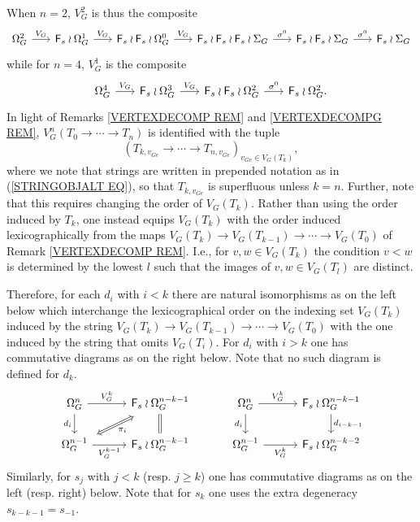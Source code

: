 \documentclass[a4paper,10pt]{article}%
\begin{document}
\begin{remark}\label{VGN REM}
When $n = 2$, $V_{G}^{2}$ is thus the composite
\[
\begin{tikzcd}[column sep =1.7em]
	\Omega_{G}^{2} \ar{r}{V_G} &
	\Fin_s \wr \Omega_{G}^{1} \ar{r}{V_G} &
	\Fin_s \wr \Fin_s \wr \Omega_{G}^{0} \ar{r}{V_G} &
	\Fin_s \wr \Fin_s \wr \Fin_s \wr \Sigma_{G} \ar{r}{\sigma^0} &
	\Fin_s \wr \Fin_s \wr \Sigma_{G} \ar{r}{\sigma^0} &
	\Fin_s \wr \Sigma_{G}
\end{tikzcd}
\]
while for $n=4$,  $V_{G}^{1}$ is the composite
\[
\begin{tikzcd}[column sep =1.7em]
	\Omega_{G}^{4} \ar{r}{V_G} &
	\Fin_s \wr \Omega_{G}^{3} \ar{r}{V_G} &
	\Fin_s \wr \Fin_s \wr \Omega_{G}^{2} \ar{r}{\sigma^0} &
	\Fin_s \wr \Omega_{G}^{2}.
\end{tikzcd}
\]
In light of Remarks \ref{VERTEXDECOMP REM} and \ref{VERTEXDECOMPG REM}, 
$V_{G}^{n}(T_0 \to \cdots \to T_n)$ is identified with the tuple 
\begin{equation}\label{VGNISO EQ}
	(T_{k,v_{G e}}\to \cdots \to T_{n,v_{G e}})_{v_{G e} \in V_G(T_k)},
\end{equation}
where we note that strings are written in prepended notation as in (\ref{STRINGOBJALT EQ}), so that $T_{k,v_{G e}}$ is superfluous unless $k=n$.
Further, note that this requires changing the order of $V_G(T_k)$.
Rather than using the order induced by $T_k$, one instead equips 
$V_G(T_k)$ with the order induced lexicographically
from the maps 
$V_G(T_k) \to V_G(T_{k-1}) \to \cdots \to V_G(T_0)$ 
of Remark \ref{VERTEXDECOMP REM}. I.e., for 
$v,w \in V_G(T_k)$ the condition $v<w$ is determined by the lowest $l$ such that the images of $v,w \in V_G(T_l)$ are distinct.

Therefore, for each $d_i$ with $i < k$ there are natural isomorphisms as on the left below which interchange the
lexicographical order on the indexing set $V_G(T_k)$
induced by the string
$V_G(T_k) \to V_G(T_{k-1}) \to \cdots \to V_G(T_0)$ 
with the one induced by the string that omits $V_G(T_i)$.
For $d_i$ with $i>k$ one has commutative diagrams as on the right below.
Note that no such diagram is defined for $d_k$.
\begin{equation}\label{PIIDEFDI EQ}
\begin{tikzcd}[row sep=1.7em,column sep = 3em]
	\Omega_{G}^{n} \ar{d}[swap]{d_{i}} \ar{r}{V_G^k} &
	|[alias=F1]|
	\Fin_s \wr \Omega_{G}^{n-k-1}
	\ar[equal]{d} 
&
	\Omega_{G}^{n} \ar{d}[swap]{d_{i}} \ar{r}{V_G^k} &
	\Fin_s \wr \Omega_{G}^{n-k-1}
	\ar{d}{d_{i-k-1}} 
\\
	|[alias=G2]|
	\Omega_{G}^{n-1} \ar{r}[swap]{V_G^{k-1}}&
	\Fin_s \wr \Omega_{G}^{n-k-1}  
&
	\Omega_{G}^{n-1} \ar{r}[swap]{V_G^{k}}&
	\Fin_s \wr \Omega_{G}^{n-k-2}  
\arrow[Leftrightarrow, from=F1, to=G2,shorten >=0.15cm,shorten <=0.15cm,"\pi_{i}"]
\end{tikzcd}
\end{equation}
Similarly, for $s_j$ with $j<k$ (resp. $j \geq k$) one
has commutative diagrams as on the left (resp. right) below. Note that for $s_k$ one uses the extra degeneracy 
$s_{k-k-1}=s_{-1}$.


\end{remark}
\end{document}
